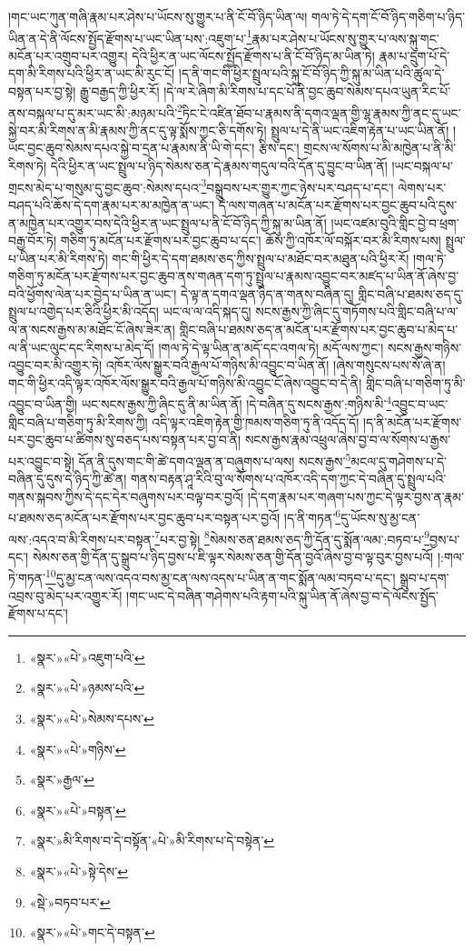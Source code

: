 །གང་ཡང་ཀུན་གཞི་རྣམ་པར་ཤེས་པ་ཡོངས་སུ་གྱུར་པ་ནི་ངོ་བོ་ཉིད་ཡིན་ལ། གལ་ཏེ་དེ་དག་ངོ་བོ་ཉིད་གཅིག་པ་ཉིད་ཡིན་ན་དེ་ནི་ལོངས་སྤྱོད་རྫོགས་པ་ཡང་ཡིན་པས་:འཇུག་པ་\footnote{«སྣར་»«པེ་»འཇུག་པའི་}རྣམ་པར་ཤེས་པ་ཡོངས་སུ་གྱུར་པ་ལས་སྐུ་གང་མངོན་པར་འགྲུབ་པར་འགྱུར། དེའི་ཕྱིར་ན་ཡང་ལོངས་སྤྱོད་རྫོགས་པ་ནི་ངོ་བོ་ཉིད་མ་ཡིན་ཏེ། རྣམ་པ་དྲུག་པོ་དེ་དག་མི་རིགས་པའི་ཕྱིར་ན་ཡང་མི་རུང་ངོ། །ད་ནི་གང་གི་ཕྱིར་སྤྲུལ་པའི་སྐུ་ངོ་བོ་ཉིད་ཀྱི་སྐུ་མ་ཡིན་པའི་ཚུལ་དེ་བསྟན་པར་བྱ་སྟེ། རྒྱུ་བརྒྱད་ཀྱི་ཕྱིར་རོ། །དེ་ལ་རེ་ཞིག་མི་རིགས་པ་དང་པོ་ནི་བྱང་ཆུབ་སེམས་དཔའ་ཡུན་རིང་པོ་ནས་བསྐལ་པ་དུ་མར་ཡང་མི་:མཉམ་པའི་\footnote{«སྣར་»«པེ་»ཉམས་པའི་}ཏིང་ངེ་འཛིན་ཐོབ་པ་རྣམས་ནི་དགའ་ལྡན་གྱི་ལྷ་རྣམས་ཀྱི་ནང་དུ་ཡང་སྐྱེ་བར་མི་རིགས་ན་མི་རྣམས་ཀྱི་ནང་དུ་ལྟ་སྨོས་ཀྱང་ཅི་དགོས་ཏེ། སྤྲུལ་པ་དེ་ནི་ཡང་འཇིག་རྟེན་པ་ཡང་ཡིན་ནོ། །ཡང་བྱང་ཆུབ་སེམས་དཔའ་སྐྱེ་བ་དྲན་པ་རྣམས་ནི་ཡི་གེ་དང་། རྩིས་དང་། གྲངས་ལ་སོགས་པ་མི་མཁྱེན་པ་ནི་མི་རིགས་ཏེ། དེའི་ཕྱིར་ན་ཡང་སྤྲུལ་པ་ཉིད་སེམས་ཅན་དེ་རྣམས་གདུལ་བའི་དོན་དུ་བྱུང་བ་ཡིན་ནོ། །ཡང་བསྐལ་པ་གྲངས་མེད་པ་གསུམ་དུ་བྱང་ཆུབ་:སེམས་དཔའ་\footnote{«སྣར་»«པེ་»སེམས་དཔས་}བསྒྲུབས་པར་གྱུར་ཀྱང་ཉེས་པར་བཤད་པ་དང་། ལེགས་པར་བཤད་པའི་ཆོས་དེ་དག་རྣམ་པར་མ་མཁྱེན་ན་ཡང་། དེ་ལས་གཞན་པ་མངོན་པར་རྫོགས་པར་བྱང་ཆུབ་པའི་དུས་ན་མཁྱེན་པར་འགྱུར་བས་དེའི་ཕྱིར་ན་ཡང་སྤྲུལ་པ་ནི་ངོ་བོ་ཉིད་ཀྱི་སྐུ་མ་ཡིན་ནོ། །ཡང་འཛམ་བུའི་གླིང་བྱེ་བ་ཕྲག་བརྒྱ་བོར་ཏེ། གཅིག་ཏུ་མངོན་པར་རྫོགས་པར་བྱང་ཆུབ་པ་དང་། ཆོས་ཀྱི་འཁོར་ལོ་བསྐོར་བར་མི་རིགས་པས། སྤྲུལ་པ་ཡིན་པར་མི་རིགས་ཏེ། གང་གི་ཕྱིར་དེ་དག་ཐམས་ཅད་ཀྱིས་སྤྲུལ་པ་མཐོང་བར་མཐུན་པའི་ཕྱིར་རོ། །གལ་ཏེ་གཅིག་ཏུ་མངོན་པར་རྫོགས་པར་བྱང་ཆུབ་ནས་གཞན་དག་ཏུ་སྤྲུལ་པ་རྣམས་འབྱུང་བར་མཛད་པ་ཡིན་ནོ་ཞེས་བྱ་བའི་ཕྱོགས་ལེན་པར་བྱེད་པ་ཡིན་ན་ཡང་། དེ་ལྟ་ན་དགའ་ལྡན་ཉིད་ན་གནས་བཞིན་དུ། གླིང་བཞི་པ་ཐམས་ཅད་དུ་སྤྲུལ་པ་འགྱེད་པར་ཅིའི་ཕྱིར་མི་འདོད། ཡང་ལ་ལ་འདི་སྐད་དུ། སངས་རྒྱས་ཀྱི་ཞིང་དུ་གཏོགས་པའི་གླིང་བཞི་པ་ལ་ལ་ན་སངས་རྒྱས་མ་མཐོང་ངོ་ཞེས་ཟེར་ན། གླིང་བཞི་པ་ཐམས་ཅད་ན་མངོན་པར་རྫོགས་པར་བྱང་ཆུབ་པ་མེད་པ་ལ་ནི་ཡང་ལུང་དང་རིགས་པ་མེད་དོ། །གལ་ཏེ་དེ་ལྟ་ཡིན་ན་མདོ་དང་འགལ་ཏེ། མདོ་ལས་ཀྱང་། སངས་རྒྱས་གཉིས་འབྱུང་བར་མི་འགྱུར་ཏེ། འཁོར་ལོས་སྒྱུར་བའི་རྒྱལ་པོ་གཉིས་མི་འབྱུང་བ་ཡིན་ནོ། །ཞེས་གསུངས་པས་སོ་ཞེ་ན། གང་གི་ཕྱིར་འདི་ལྟར་འཁོར་ལོས་སྒྱུར་བའི་རྒྱལ་པོ་གཉིས་མི་འབྱུང་ངོ་ཞེས་འབྱུང་བ་དེ་ནི། གླིང་བཞི་པ་གཅིག་ཏུ་མི་འབྱུང་བ་ཡིན་གྱི། ཡང་སངས་རྒྱས་ཀྱི་ཞིང་དུ་ནི་མ་ཡིན་ནོ། །དེ་བཞིན་དུ་སངས་རྒྱས་:གཉིས་མི་\footnote{«སྣར་»«པེ་»གཉིས་}འབྱུང་བ་ཡང་གླིང་བཞི་པ་གཅིག་ཏུ་མི་རིགས་ཀྱི། འདི་ལྟར་འཇིག་རྟེན་གྱི་ཁམས་གཅིག་ཏུ་ནི་འདོད་དོ། །ད་ནི་མངོན་པར་རྫོགས་པར་བྱང་ཆུབ་པ་ཚིགས་སུ་བཅད་པས་བསྟན་པར་བྱ་བ་ནི། སངས་རྒྱས་རྣམ་འཕྲུལ་ཞེས་བྱ་བ་ལ་སོགས་པ་རྒྱས་པར་འབྱུང་བ་སྟེ། དོན་ནི་དུས་གང་གི་ཚེ་དགའ་ལྡན་ན་བཞུགས་པ་ལས། སངས་རྒྱས་\footnote{«སྣར་»རྒྱལ་}མངལ་དུ་གཤེགས་པ་དེ་བཞིན་དུ་དུས་དེ་ཉིད་ཀྱི་ཚེ་ན། གནས་བརྟན་ཤཱ་རིའི་བུ་ལ་སོགས་པ་འཁོར་འདི་དག་ཀྱང་དེ་བཞིན་དུ་སྤྲུལ་པའི་གནས་སྐབས་ཀྱིས་དེ་དང་དེར་བཞུགས་པར་བལྟ་བར་བྱའོ། །དེ་དག་རྣམ་པར་གཞག་པས་ཀྱང་དེ་ལྟར་བྱས་ན་རྣམ་པ་ཐམས་ཅད་མངོན་པར་རྫོགས་པར་བྱང་ཆུབ་པར་བསྟན་པར་བྱའོ། །ད་ནི་གཏན་\footnote{«སྣར་»«པེ་»བསྟན་}དུ་ཡོངས་སུ་མྱ་ངན་ལས་:འདའ་བ་མི་རིགས་པར་བསྟན་\footnote{«སྣར་»མི་རིགས་བ་དེ་བསྟོན་«པེ་»མི་རིགས་པ་དེ་བསྟེན་}པར་བྱ་སྟེ། \footnote{«སྣར་»«པེ་»སྟེ་དེས་}སེམས་ཅན་ཐམས་ཅད་ཀྱི་དོན་དུ་སྨོན་ལམ་:བཏབ་པ་\footnote{«སྡེ་»བཏབ་པར་}བྱས་པ་དང་། སེམས་ཅན་གྱི་དོན་དུ་སྒྲུབ་པ་ཉིད་བྱས་པ་ཇི་ལྟར་སེམས་ཅན་གྱི་དོན་བྱའོ་ཞེས་བྱ་བ་ལྟ་བུར་བྱས་པའོ། །:གལ་ཏེ་གཏན་\footnote{«སྣར་»«པེ་»གང་དེ་བསྟན་}དུ་མྱ་ངན་ལས་འདའ་བས་མྱ་ངན་ལས་འདས་པ་ཡིན་ན་གང་སྨོན་ལམ་བཏབ་པ་དང་། སྒྲུབ་པ་དག་འབྲས་བུ་མེད་པར་འགྱུར་རོ། །གང་ཡང་དེ་བཞིན་གཤེགས་པའི་རྟག་པའི་སྐུ་ཡིན་ནོ་ཞེས་བྱ་བ་དེ་ལོངས་སྤྱོད་རྫོགས་པ་དང་། 